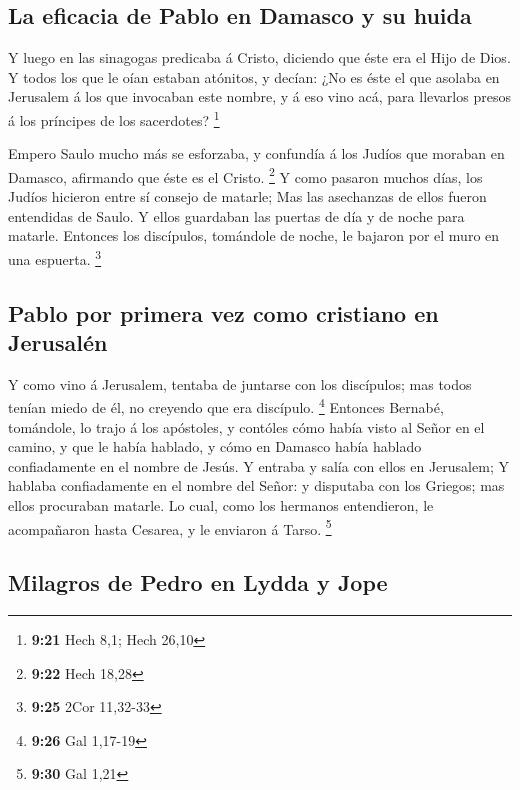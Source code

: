 \hypertarget{la-eficacia-de-pablo-en-damasco-y-su-huida}{%
\subsection{La eficacia de Pablo en Damasco y su
huida}\label{la-eficacia-de-pablo-en-damasco-y-su-huida}}

 Y luego en las sinagogas predicaba á Cristo, diciendo
que éste era el Hijo de Dios.  Y todos los que le oían
estaban atónitos, y decían: ¿No es éste el que asolaba en Jerusalem á
los que invocaban este nombre, y á eso vino acá, para llevarlos presos á
los príncipes de los sacerdotes? \footnote{\textbf{9:21} Hech 8,1; Hech
  26,10}

 Empero Saulo mucho más se esforzaba, y confundía á los
Judíos que moraban en Damasco, afirmando que éste es el Cristo.
\footnote{\textbf{9:22} Hech 18,28}  Y como pasaron
muchos días, los Judíos hicieron entre sí consejo de matarle;
 Mas las asechanzas de ellos fueron entendidas de Saulo.
Y ellos guardaban las puertas de día y de noche para matarle.
 Entonces los discípulos, tomándole de noche, le bajaron
por el muro en una espuerta. \footnote{\textbf{9:25} 2Cor 11,32-33}

\hypertarget{pablo-por-primera-vez-como-cristiano-en-jerusaluxe9n}{%
\subsection{Pablo por primera vez como cristiano en
Jerusalén}\label{pablo-por-primera-vez-como-cristiano-en-jerusaluxe9n}}

 Y como vino á Jerusalem, tentaba de juntarse con los
discípulos; mas todos tenían miedo de él, no creyendo que era discípulo.
\footnote{\textbf{9:26} Gal 1,17-19}  Entonces Bernabé,
tomándole, lo trajo á los apóstoles, y contóles cómo había visto al
Señor en el camino, y que le había hablado, y cómo en Damasco había
hablado confiadamente en el nombre de Jesús.  Y entraba y
salía con ellos en Jerusalem;  Y hablaba confiadamente en
el nombre del Señor: y disputaba con los Griegos; mas ellos procuraban
matarle.  Lo cual, como los hermanos entendieron, le
acompañaron hasta Cesarea, y le enviaron á Tarso. \footnote{\textbf{9:30}
  Gal 1,21}

\hypertarget{milagros-de-pedro-en-lydda-y-jope}{%
\subsection{Milagros de Pedro en Lydda y
Jope}\label{milagros-de-pedro-en-lydda-y-jope}}

